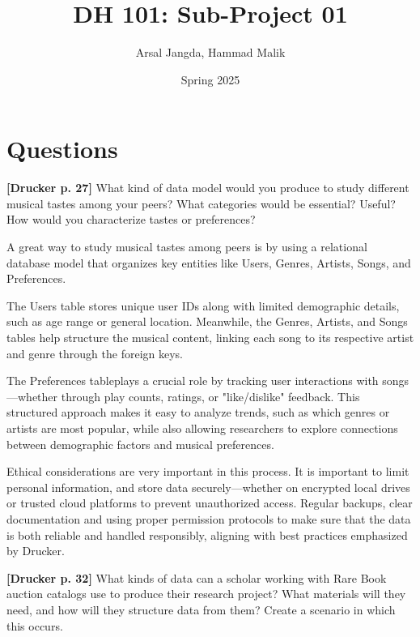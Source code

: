 \documentclass[a4paper]{exam}
\begin{document}
\title{DH 101: Sub-Project 01}
\author{Arsal Jangda, Hammad Malik}
\date{Spring 2025}

\maketitle


\section*{Questions}

\begin{questions}

\question[5] \textbf{[Drucker p. 27]} What kind of data model would you produce to study different musical tastes among your peers? What categories would be essential? Useful? How would you characterize tastes or preferences?


A great way to study musical tastes among peers is by using a relational database model that organizes key entities like Users, Genres, Artists, Songs, and Preferences. 

The Users table stores unique user IDs along with limited demographic details, such as age range or general location. Meanwhile, the Genres, Artists, and Songs tables help structure the musical content, linking each song to its respective artist and genre through the foreign keys.

The Preferences tableplays a crucial role by tracking user interactions with songs—whether through play counts, ratings, or "like/dislike" feedback. This structured approach makes it easy to analyze trends, such as which genres or artists are most popular, while also allowing researchers to explore connections between demographic factors and musical preferences.

Ethical considerations are very important in this process. It is important to limit personal information, and store data securely—whether on encrypted local drives or trusted cloud platforms to prevent unauthorized access. Regular backups, clear documentation and using proper permission protocols to make sure that the data is both reliable and handled responsibly, aligning with best practices emphasized by Drucker.

\question[5] \textbf{[Drucker p. 32]} What kinds of data can a scholar working with Rare Book auction catalogs use to produce their research project? What materials will they need, and how will they structure data from them? Create a scenario in which this occurs.



\end{questions}
\end{document}
